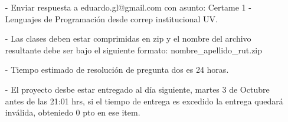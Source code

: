 \documentclass[10pt]{article}
\begin{document}
\begin{itemize}
  \item [-] Enviar respuesta a eduardo.gl@gmail.com con asunto: Certame 1 - Lenguajes de Programaci\'on desde correp institucional UV.
  \item [-] Las clases deben estar comprimidas en zip y el nombre del archivo resultante debe ser bajo el siguiente formato: nombre\_apellido\_rut.zip
  \item [-] Tiempo estimado de resoluci\'on  de pregunta dos es 24 horas.
  \item [-] El proyecto desbe estar entregado al d\'ia siguiente, martes 3 de Octubre antes de las 21:01 hrs, si el tiempo de entrega es excedido la entrega quedar\'a inv\'alida, obteniedo 0 pto en ese item.
\end{itemize}
\end{document}
